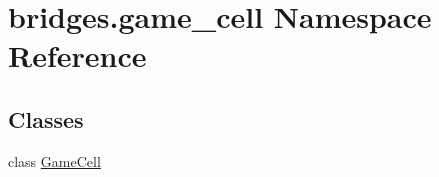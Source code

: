 \hypertarget{namespacebridges_1_1game__cell}{}\section{bridges.\+game\+\_\+cell Namespace Reference}
\label{namespacebridges_1_1game__cell}
\subsection*{Classes}
\begin{DoxyCompactItemize}
\item 
class \hyperlink{classbridges_1_1game__cell_1_1_game_cell}{Game\+Cell}
\end{DoxyCompactItemize}

